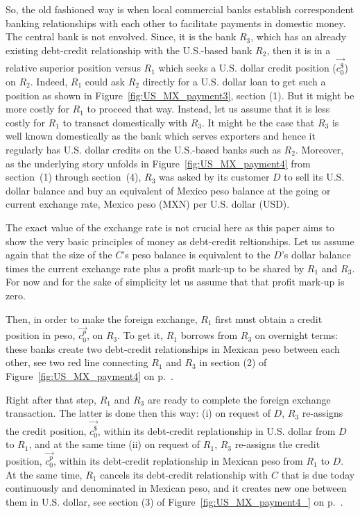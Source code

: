 So, the old fashioned way is when local commercial banks establish correspondent banking relationships with each other to facilitate payments in domestic money. The central bank is not envolved. Since, it is the bank $R_3$, which has an already existing debt-credit relationship with the U.S.-based bank $R_2$, then it is in a relative superior position versus $R_1$ which seeks a U.S. dollar credit position ($\overrightarrow{c^{\$}_{0}}$) on $R_2$. Indeed, $R_1$ could ask $R_2$ directly for a U.S. dollar loan to get such a position as shown in Figure~\ref{fig:US_MX_payment3}, section (1). But it might be more costly for $R_1$ to proceed that way. Instead, let us assume that it is less costly for $R_1$ to transact domestically with $R_3$. It might be the case that $R_3$ is well known domestically  as the bank which serves exporters and hence it regularly has U.S. dollar credits on the U.S.-based banks such as $R_2$. Moreover, as the underlying story unfolds in Figure~\ref{fig:US_MX_payment4} from section~(1) through section~(4), $R_3$ was asked by its customer $D$ to sell its U.S. dollar balance and buy an equivalent of Mexico peso balance at the going or current exchange rate, Mexico peso (MXN) per U.S. dollar (USD). 

The exact value of the exchange rate is not crucial here as this paper aims to show the very basic principles of money as debt-credit reltionships. Let us assume again that the size of the $C$'s peso balance is equivalent to the $D$'s dollar balance times the current exchange rate plus a profit mark-up to be shared by $R_1$ and $R_3$. For now and for the sake of simplicity let us assume that that profit mark-up is zero.  

Then, in order to make the foreign exchange, $R_1$ first must obtain a credit position in peso, $\overrightarrow{c^{p}_{0}}$, on $R_3$. To get it, $R_1$ borrows from $R_3$ on overnight terms: these banks create two debt-credit relationships in Mexican peso between each other, see two red line connecting $R_1$ and $R_3$ in section (2) of Figure~\ref{fig:US_MX_payment4} on p.~\pageref{fig:US_MX_payment4}.   

Right after that step, $R_1$ and $R_3$ are ready to complete the foreign exchange transaction. The latter is done then this way: (i) on request of $D$, $R_3$ re-assigns the credit position, $\overrightarrow{c^{\$}_{0}}$, within its debt-credit replationship in U.S. dollar from $D$ to $R_1$, and at the same time (ii) on request of $R_1$, $R_3$ re-assigns the credit position, $\overrightarrow{c^{p}_{0}}$, within its debt-credit replationship in Mexican peso from $R_1$ to $D$. At the same time, $R_1$ cancels its debt-credit relationship with $C$ that is due today continuously and denominated in Mexican peso, and it creates new one between them in U.S. dollar, see section (3) of Figure~\ref{fig:US_MX_payment4_} on p.~\pageref{fig:US_MX_payment4_}.  

